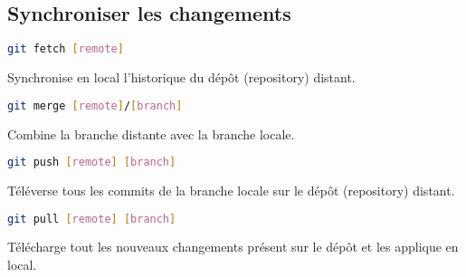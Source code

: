 \documentclass[10pt,landscape]{article}
\begin{document}
\begin{multicols}{3}
\section{Synchroniser les changements}
\begin{lstlisting}[language=bash]
git fetch [remote]
\end{lstlisting}
Synchronise en local l'historique du dépôt (repository) distant.
\begin{lstlisting}[language=bash]
git merge [remote]/[branch]
\end{lstlisting}
Combine la branche distante avec la branche locale.
\begin{lstlisting}[language=bash]
git push [remote] [branch]
\end{lstlisting}
Téléverse tous les commits de la branche locale sur le dépôt (repository) distant.
\begin{lstlisting}[language=bash]
git pull [remote] [branch]
\end{lstlisting}
Télécharge tout les nouveaux changements présent sur le dépôt et les applique en local.

\end{multicols}
\end{document}
